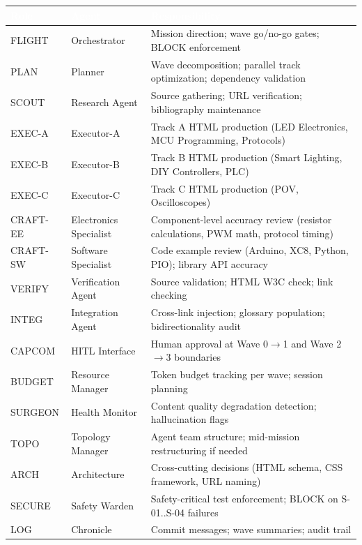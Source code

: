 \documentclass[11pt,letterpaper]{article}
\newcommand{\tableheader}[1]{\textbf{\sffamily\textcolor{white}{#1}}}
\begin{document}
\begin{center}
\begin{tabularx}{\textwidth}{L{2cm}L{3cm}X}
\toprule
{}
\tableheader{Role} & \tableheader{Agent} & \tableheader{Responsibility} \\
\midrule
FLIGHT & Orchestrator & Mission direction; wave go/no-go gates; BLOCK enforcement \\
PLAN & Planner & Wave decomposition; parallel track optimization; dependency validation \\
SCOUT & Research Agent & Source gathering; URL verification; bibliography maintenance \\
EXEC-A & Executor-A & Track A HTML production (LED Electronics, MCU Programming, Protocols) \\
EXEC-B & Executor-B & Track B HTML production (Smart Lighting, DIY Controllers, PLC) \\
EXEC-C & Executor-C & Track C HTML production (POV, Oscilloscopes) \\
CRAFT-EE & Electronics Specialist & Component-level accuracy review (resistor calculations, PWM math, protocol timing) \\
CRAFT-SW & Software Specialist & Code example review (Arduino, XC8, Python, PIO); library API accuracy \\
VERIFY & Verification Agent & Source validation; HTML W3C check; link checking \\
INTEG & Integration Agent & Cross-link injection; glossary population; bidirectionality audit \\
CAPCOM & HITL Interface & Human approval at Wave 0$\rightarrow$1 and Wave 2$\rightarrow$3 boundaries \\
BUDGET & Resource Manager & Token budget tracking per wave; session planning \\
SURGEON & Health Monitor & Content quality degradation detection; hallucination flags \\
TOPO & Topology Manager & Agent team structure; mid-mission restructuring if needed \\
ARCH & Architecture & Cross-cutting decisions (HTML schema, CSS framework, URL naming) \\
SECURE & Safety Warden & Safety-critical test enforcement; BLOCK on S-01..S-04 failures \\
LOG & Chronicle & Commit messages; wave summaries; audit trail \\
\bottomrule
\end{tabularx}
\end{center}
\end{document}
